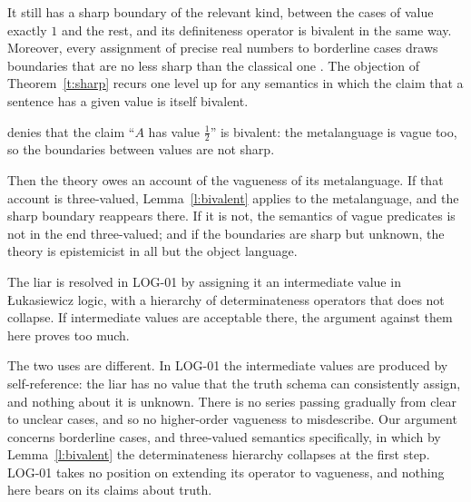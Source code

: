 \documentclass{situationist-preprint}
\begin{document}
\begin{reply}
It still has a sharp boundary of the relevant kind, between the cases of value exactly $1$ and the rest, and its definiteness operator is bivalent in the same way. Moreover, every assignment of precise real numbers to borderline cases draws boundaries that are no less sharp than the classical one \citep{Keefe2000}. The objection of Theorem~\ref{t:sharp} recurs one level up for any semantics in which the claim that a sentence has a given value is itself bivalent.
\end{reply}

\begin{objection}
\citet{Tye1994} denies that the claim \enquote{$A$ has value $\tfrac12$} is bivalent: the metalanguage is vague too, so the boundaries between values are not sharp.
\end{objection}

\begin{reply}
Then the theory owes an account of the vagueness of its metalanguage. If that account is three-valued, Lemma~\ref{l:bivalent} applies to the metalanguage, and the sharp boundary reappears there. If it is not, the semantics of vague predicates is not in the end three-valued; and if the boundaries are sharp but unknown, the theory is epistemicist in all but the object language.
\end{reply}

\begin{objection}
The liar is resolved in LOG-01 by assigning it an intermediate value in Łukasiewicz logic, with a hierarchy of determinateness operators that does not collapse. If intermediate values are acceptable there, the argument against them here proves too much.
\end{objection}

\begin{reply}
The two uses are different. In LOG-01 the intermediate values are produced by self-reference: the liar has no value that the truth schema can consistently assign, and nothing about it is unknown. There is no series passing gradually from clear to unclear cases, and so no higher-order vagueness to misdescribe. Our argument concerns borderline cases, and three-valued semantics specifically, in which by Lemma~\ref{l:bivalent} the determinateness hierarchy collapses at the first step. LOG-01 takes no position on extending its operator to vagueness, and nothing here bears on its claims about truth.
\end{reply}
\end{document}
